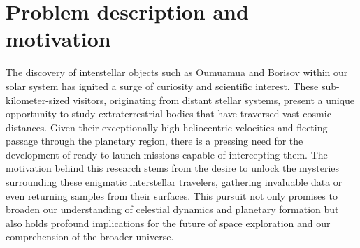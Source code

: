 \section{Problem description and motivation}

The discovery of interstellar objects such as Oumuamua and Borisov within our
solar system has ignited a surge of curiosity and scientific interest. These
sub-kilometer-sized visitors, originating from distant stellar systems, present
a unique opportunity to study extraterrestrial bodies that have traversed vast
cosmic distances. Given their exceptionally high heliocentric velocities and
fleeting passage through the planetary region, there is a pressing need for the
development of ready-to-launch missions capable of intercepting them. The
motivation behind this research stems from the desire to unlock the mysteries
surrounding these enigmatic interstellar travelers, gathering invaluable data or
even returning samples from their surfaces. This pursuit not only promises to
broaden our understanding of celestial dynamics and planetary formation but also
holds profound implications for the future of space exploration and our
comprehension of the broader universe.
